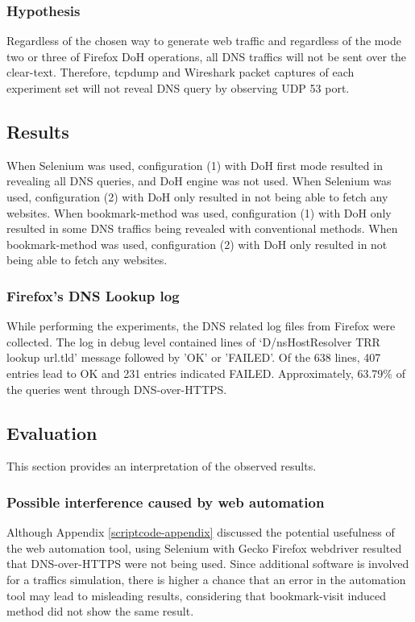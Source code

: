 \subsubsection{Hypothesis}
Regardless of the chosen way to generate web traffic and regardless of the mode two or three of Firefox DoH operations, all DNS traffics will not be sent over the clear-text. Therefore, tcpdump and Wireshark packet captures of each experiment set will not reveal DNS query by observing UDP 53 port.

\subsection{Results}
When Selenium was used, configuration (1) with DoH first mode resulted in revealing all DNS queries, and DoH engine was not used.
When Selenium was used, configuration (2) with DoH only resulted in not being able to fetch any websites.
When bookmark-method was used, configuration (1) with DoH only resulted in some DNS traffics being revealed with conventional methods.
When bookmark-method was used, configuration (2) with DoH only resulted in not being able to fetch any websites.

\subsubsection{Firefox's DNS Lookup log}
While performing the experiments, the DNS related log files from Firefox were collected.
The log in debug level contained lines of `D/nsHostResolver TRR lookup url.tld' message followed by 'OK' or 'FAILED'.
Of the 638 lines, 407 entries lead to OK and 231 entries indicated FAILED. Approximately, 63.79\% of the queries went through DNS-over-HTTPS.

\subsection{Evaluation}
This section provides an interpretation of the observed results.

\subsubsection{Possible interference caused by web automation}
Although Appendix \ref{scriptcode-appendix} discussed the potential usefulness of the web automation tool, using Selenium with Gecko Firefox webdriver resulted that DNS-over-HTTPS were not being used.
Since additional software is involved for a traffics simulation, there is higher a chance that an error in the automation tool may lead to misleading results, considering that bookmark-visit induced method did not show the same result.

